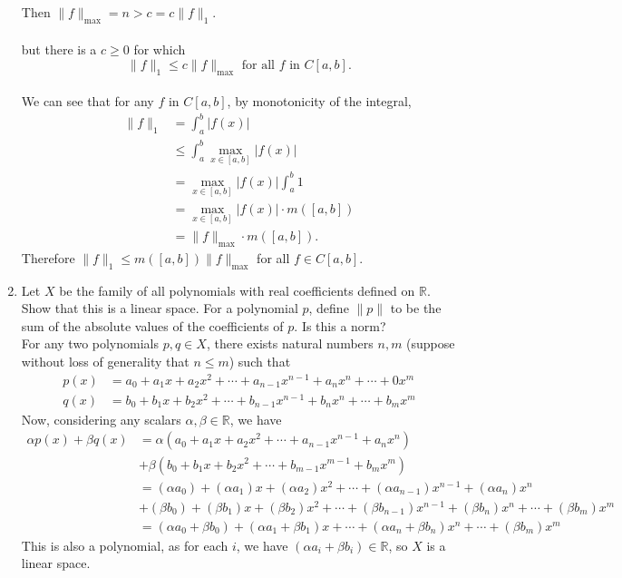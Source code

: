 \begin{enumerate}
	Then $\| f \|_{\max}=n > c =  c \| f \|_1$.\\
	\\
	but there is a $c \ge 0$ for which 
	\[
	\| f \|_1	\le c \| f \|_{\max} \text{ for all $f$ in $C[a,b]$}.
	\]
	\\
	We can see that for any $f$ in $C[a,b]$, by monotonicity of the integral, 
	\begin{align*}
	\|f\|_1 &= \int_a^b|f(x)|\\ 
	&\le \int_a^b\max_{x\in [a,b]}|f(x)|\\
	&=\max_{x\in [a,b]}|f(x)| \int_a^b1\\
	&= \max_{x\in [a,b]}|f(x)| \cdot m([a,b]) \\
	&= \|f\|_{\max} \cdot m([a,b]).
	\end{align*}
	Therefore $\|f\|_1\le m([a,b])\|f\|_{\max}$ for all $f\in C[a,b]$.
	\item Let $X$ be the family of all polynomials with real coefficients defined on $\mathbb{R}$.
	Show that this is a linear space. For a polynomial $p$, define $\| p\|$ to be the sum of the absolute values of the coefficients of $p$.
	Is this a norm?\\
	For any two polynomials $p,q\in X$, there exists natural numbers $n,m$ (suppose without loss of generality that $n\le m$) such that
	\begin{align*}
	p(x) &= a_0+a_1x+a_2x^2+\cdots+a_{n-1}x^{n-1}+a_nx^n+\cdots+0x^m	\\
	q(x) &= b_0+b_1x+b_2x^2+\cdots+b_{n-1}x^{n-1}+b_nx^n+\cdots+b_mx^m	
	\end{align*}
	Now, considering any scalars $\alpha,\beta \in \mathbb{R}$, we have
	\begin{align*}
		\alpha p(x) + \beta q(x) &= \alpha (a_0+a_1x+a_2x^2+\cdots+a_{n-1}x^{n-1}+a_nx^n)\\
		&+ \beta (b_0+b_1x+b_2x^2+\cdots+b_{m-1}x^{m-1}+b_mx^m)\\
		&=(\alpha a_0)+(\alpha a_1)x+(\alpha a_2)x^2+\cdots+(\alpha a_{n-1})x^{n-1}+(\alpha a_n)x^n\\
		&+ (\beta b_0)+(\beta b_1)x+(\beta b_2)x^2+\cdots+(\beta b_{n-1})x^{n-1}+(\beta b_n)x^n+\cdots+(\beta b_m)x^m\\
		&=(\alpha a_0+\beta b_0)+(\alpha a_1+\beta b_1)x+\cdots+(\alpha a_n+\beta b_n)x^n+\cdots+(\beta b_m)x^m
	\end{align*}
	This is also a polynomial, as for each $i$, we have $(\alpha a_i+\beta b_i) \in \mathbb{R}$, so $X$ is a linear space.\\

\end{enumerate}
